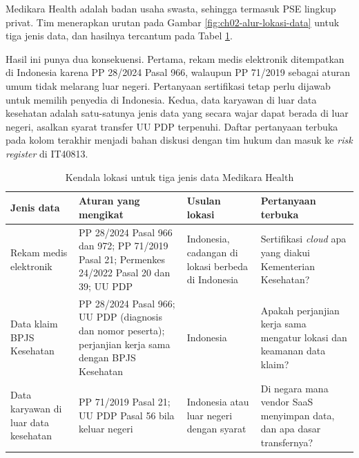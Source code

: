 \begin{kasus}[title={Kasus Medikara Health: Tiga Jenis Data, Tiga Kendala}]
  Medikara Health adalah badan usaha swasta, sehingga termasuk PSE lingkup privat. Tim
  menerapkan urutan pada Gambar \ref{fig:ch02-alur-lokasi-data} untuk tiga jenis data, dan
  hasilnya tercantum pada Tabel \ref{tab:ch02-tiga-data}.

  Hasil ini punya dua konsekuensi. Pertama, rekam medis elektronik ditempatkan di Indonesia
  karena PP 28/2024 Pasal 966, walaupun PP 71/2019 sebagai aturan umum tidak melarang luar
  negeri. Pertanyaan sertifikasi tetap perlu dijawab untuk memilih penyedia di Indonesia. Kedua,
  data karyawan di luar data kesehatan adalah satu-satunya jenis data yang secara wajar
  dapat berada di luar negeri, asalkan syarat transfer UU PDP terpenuhi. Daftar pertanyaan
  terbuka pada kolom terakhir menjadi bahan diskusi dengan tim hukum dan masuk ke
  \textit{risk register} di IT40813.
\end{kasus}

\begin{table}[!htb]
  \centering
  \caption{Kendala lokasi untuk tiga jenis data Medikara Health}
  \label{tab:ch02-tiga-data}
  \small
  \begin{tabularx}{\textwidth}{>{\raggedright\arraybackslash}p{2.0cm}
      >{\raggedright\arraybackslash}X >{\raggedright\arraybackslash}p{2.6cm}
      >{\raggedright\arraybackslash}X}
    \hline
    \textbf{Jenis data} & \textbf{Aturan yang mengikat} & \textbf{Usulan lokasi} &
      \textbf{Pertanyaan terbuka} \\
    \hline
    Rekam medis elektronik & PP 28/2024 Pasal 966 dan 972; PP 71/2019 Pasal 21; Permenkes
      24/2022 Pasal 20 dan 39; UU PDP & Indonesia, cadangan di lokasi berbeda di Indonesia & Sertifikasi \textit{cloud} apa
      yang diakui Kementerian Kesehatan? \\
    \hline
    Data klaim BPJS Kesehatan & PP 28/2024 Pasal 966; UU PDP (diagnosis dan nomor peserta);
      perjanjian kerja sama dengan BPJS Kesehatan & Indonesia & Apakah perjanjian kerja sama
      mengatur lokasi dan keamanan data klaim? \\
    \hline
    Data karyawan di luar data kesehatan & PP 71/2019 Pasal 21; UU PDP Pasal 56 bila keluar negeri & Indonesia atau
      luar negeri dengan syarat & Di negara mana vendor SaaS menyimpan data, dan apa dasar
      transfernya? \\
    \hline
  \end{tabularx}
\end{table}


